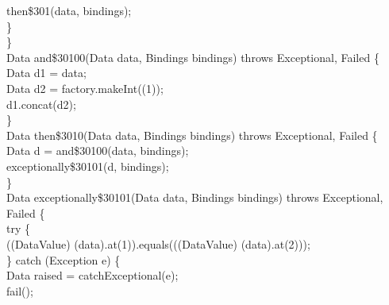 \begin{flushleft}
\hspace*{12\indentation}{\bf return} then\$301(data, bindings);\mbox{}\\
\hspace*{8\indentation}\}\mbox{}\\
\hspace*{4\indentation}\}\mbox{}\\
\hspace*{4\indentation}{\bf private} Data and\$30100(Data data, Bindings bindings) throws Exceptional, Failed \{\mbox{}\\
\hspace*{8\indentation}Data d1 = data;\mbox{}\\
\hspace*{8\indentation}Data d2 = factory.makeInt((1));\mbox{}\\
\hspace*{8\indentation}{\bf return} d1.concat(d2);\mbox{}\\
\hspace*{4\indentation}\}\mbox{}\\
\hspace*{4\indentation}{\bf private} Data then\$3010(Data data, Bindings bindings) throws Exceptional, Failed \{\mbox{}\\
\hspace*{8\indentation}Data d = and\$30100(data, bindings);\mbox{}\\
\hspace*{8\indentation}{\bf return} exceptionally\$30101(d, bindings);\mbox{}\\
\hspace*{4\indentation}\}\mbox{}\\
\hspace*{4\indentation}{\bf private} Data exceptionally\$30101(Data data, Bindings bindings) throws Exceptional, Failed \{\mbox{}\\
\hspace*{8\indentation}try \{\mbox{}\\
\hspace*{12\indentation}{\bf return} ((DataValue) (data).at(1)).equals(((DataValue) (data).at(2)));\mbox{}\\
\hspace*{8\indentation}\} catch (Exception e) \{\mbox{}\\
\hspace*{12\indentation}Data raised = catchExceptional(e);\mbox{}\\
\hspace*{12\indentation}{\bf return} fail();\mbox{}\\

\end{flushleft}
